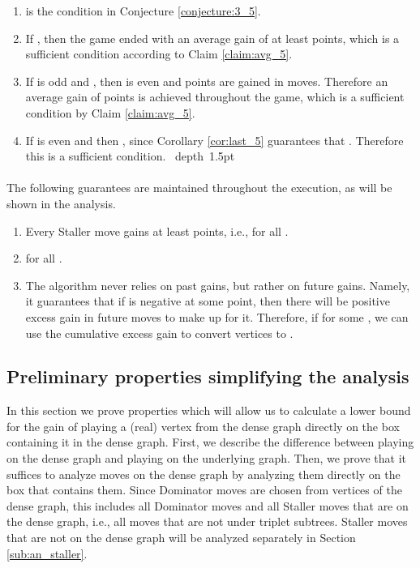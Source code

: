 \documentclass[11pt]{article}
\def\blackslug{\hbox{\hskip 1pt \vrule width 4pt height 8pt
    depth 1.5pt \hskip 1pt}}
\def\QED{\quad\blackslug\lower 8.5pt\null\par}
\def\dnsitem{\vspace{-7pt}\item}
\theoremstyle{definition}
\begin{document}
\begin{enumerate}
	\dnsitem  is the condition in Conjecture \ref{conjecture:3_5}.

	\dnsitem If , then the game ended with an average gain of at least  points, which is a sufficient condition according to Claim \ref{claim:avg_5}.
	
	\dnsitem If  is odd and , then  is even and  points are gained in  moves. Therefore an average gain of  points is achieved throughout the game, which is a sufficient condition by Claim \ref{claim:avg_5}.
	
	\dnsitem If  is even and  then , since Corollary \ref{cor:last_5} guarantees that . Therefore this is a sufficient condition.
\QED
\end{enumerate}

\paragraph{}
The following guarantees are maintained throughout the execution, as will be shown in the analysis.
\begin{enumerate}
	\dnsitem Every Staller move gains at least  points, i.e.,  for all .
	\dnsitem  for all .
	\dnsitem The algorithm never relies on past gains, but rather on future gains. Namely, it guarantees that if  is negative at some point, then there will be positive excess gain in future moves to make up for it.
Therefore, if  for some , we can use the cumulative excess gain to convert  vertices to .

\end{enumerate}

\subsection{Preliminary properties simplifying the analysis}
\label{sub:an_simplify}

In this section we prove properties which will allow us to calculate a lower bound for the gain of playing a (real) vertex from the dense graph directly on the box containing it in the dense graph.
First, we describe the difference between playing on the dense graph and playing on the underlying graph.
Then, we prove that it suffices to analyze moves on the dense graph by analyzing them directly on the box that contains them.
Since Dominator moves are chosen from vertices of the dense graph, this includes all Dominator moves and all Staller moves that are on the dense graph, i.e., all moves that are not under triplet subtrees.
Staller moves that are not on the dense graph will be analyzed separately in Section \ref{sub:an_staller}.
\end{document}

